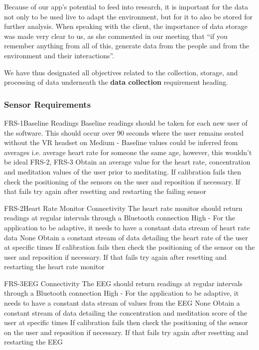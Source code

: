 \documentclass[coverpage,lineno]{../custom}
\begin{document}
Because of our app's potential to feed into research, it is important for the data not only to be used live to adapt the environment, but for it to also be stored for further analysis. When speaking with the client, the importance of data storage was made very clear to us, as she commented in our meeting that “if you remember anything from all of this, generate data from the people and from the environment and their interactions”. 
 
We have thus designated all objectives related to the collection, storage, and processing of data underneath the \textbf{data collection} requirement heading.
\subsubsection{Sensor Requirements}

\FunctionalReq
{FRS-1}{Baseline Readings}
{Baseline readings should be taken for each new user of the software. This should occur over 90 seconds where the user remains seated without  the VR headset on}
{Medium - \shouldhave}
{Baseline values could be inferred from averages i.e. average heart rate for someone the same age, however, this wouldn’t be ideal}
{FRS-2, FRS-3}
{Obtain an average value for the heart rate, concentration and meditation values of the user prior to meditating.}
{If calibration fails then check the positioning of the sensors on the user and reposition if necessary. If that fails try again after resetting and restarting the failing sensor}

\FunctionalReq
{FRS-2}{Heart Rate Monitor Connectivity}
{The heart rate monitor should return readings at regular intervals through a Bluetooth connection}
{High - \musthave}
{For the application to be adaptive, it needs to have a constant data stream of heart rate data}
{None}
{Obtain a constant stream of data detailing the heart rate of the user at specific times}
{If calibration fails then check the positioning of the sensor on the user and reposition if necessary. If that fails try again after resetting and restarting the heart rate monitor}

\FunctionalReq
{FRS-3}{EEG Connectivity}
{The EEG should return readings at regular intervals through a Bluetooth connection}
{High - \musthave}
{For the application to be adaptive, it needs to have a constant data stream of values from the EEG}
{None}
{Obtain a constant stream of data detailing the concentration and meditation score of the user at specific times}
{If calibration fails then check the positioning of the sensor on the user and reposition if necessary. If that fails try again after resetting and restarting the EEG}
\end{document}
